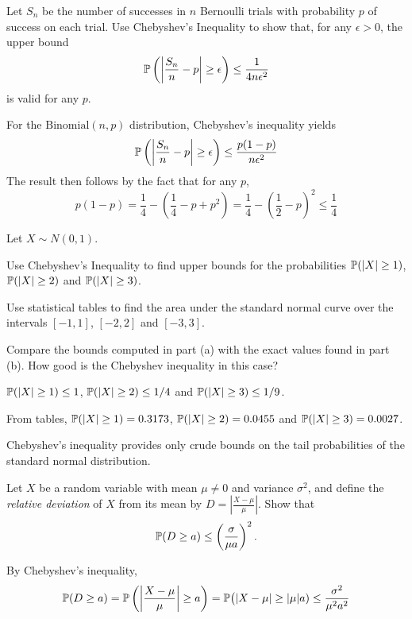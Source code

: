 \begin{exercise}
\begin{questions}
\question
Let $S_n$ be the number of successes in $n$ Bernoulli trials with probability $p$ of success on each trial. Use Chebyshev's Inequality to show that, for any $\epsilon > 0$, the upper bound
\[
\mathbb{P}\left(\left|\frac{S_n}{n}-p\right|\geq\epsilon\right) \leq \frac{1}{4n\epsilon^2}
\]
is valid for any $p$.
\begin{answer} %
For the $\text{Binomial}(n,p)$ distribution, Chebyshev's inequality yields
\[
\mathbb{P}\left(\left|\frac{S_n}{n}-p\right|\geq\epsilon\right) \leq \frac{p(1-p)}{n\epsilon^2}
\]
The result then follows by the fact that for any $p$,
\[
p(1-p) = \frac{1}{4}-\left(\frac{1}{4}-p+p^2\right) = \frac{1}{4}-\left(\frac{1}{2}-p\right)^2 \leq \frac{1}{4}
\]
\end{answer}


\question
Let $X\sim N(0,1)$.
\ben
\item 
Use Chebyshev's Inequality to find upper bounds for the probabilities $\mathbb{P}(|X|\geq 1)$, $\mathbb{P}(|X|\geq 2)$ and $\mathbb{P}(|X|\geq 3)$.
\item
Use statistical tables to find the area under the standard normal curve over the intervals $[-1,1]$, $[-2,2]$ and $[-3,3]$. 
\item
Compare the bounds computed in part (a) with the exact values found in part (b). How good is the Chebyshev inequality in this case?
\een
\begin{answer}
\ben
\item $\mathbb{P}(|X|\geq 1)\leq 1$, $\mathbb{P}(|X|\geq 2)\leq 1/4$ and $\mathbb{P}(|X|\geq 3)\leq 1/9$.
\item From tables, $\mathbb{P}(|X|\geq 1)=0.3173$, $\mathbb{P}(|X|\geq 2)=0.0455$ and $\mathbb{P}(|X|\geq 3)=0.0027$.  
\item Chebyshev's inequality provides only crude bounds on the tail probabilities of the standard normal distribution.
\een
\end{answer}


\question
Let $X$ be a random variable with mean $\mu\neq 0$ and variance $\sigma^2$, and define the \emph{relative deviation} of $X$ from its mean by $\displaystyle D  = \left|\frac{X-\mu}{\mu}\right|$. Show that 
\[
\displaystyle \mathbb{P}(D \geq a) \leq \left(\frac{\sigma}{\mu a}\right)^2.
\]
\begin{answer} 
By Chebyshev's inequality,
\[
\mathbb{P}(D\geq a) 
	= \mathbb{P}\left(\left|\frac{X-\mu}{\mu}\right|\geq a\right)
	= \mathbb{P}\big(|X-\mu|\geq |\mu|a)
	\leq \frac{\sigma^2}{\mu^2 a^2}
\]
\end{answer}

\end{questions}
\end{exercise}

\endinput
